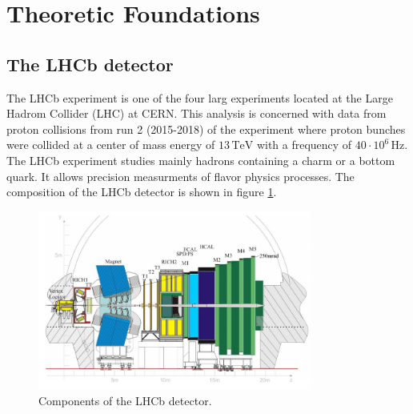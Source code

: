 \section{Theoretic Foundations}
\label{sec:Theorie}

\subsection{The LHCb detector}

The LHCb experiment is one of the four larg experiments located at the Large Hadrom Collider (LHC) at CERN. 
This analysis is concerned with data from proton collisions from run 2 (2015-2018) of the experiment where proton bunches were collided at 
a center of mass energy of $13 \, \si{\tera\eV}$ with a frequency of $40 \cdot 10^6 \, \si{\hertz}$. The LHCb experiment studies mainly hadrons 
containing a charm or a bottom quark. It allows precision measurments of flavor physics processes. 
The composition of the LHCb detector is shown in figure \ref{f1}. 
\begin{figure}[!htb]
    \centering
    \includegraphics[width=0.8\textwidth]{graphics/lhcb.png}
    \caption{Components of the LHCb detector. \cite{sample_cpv}}
    \label{f1}
  \end{figure}










